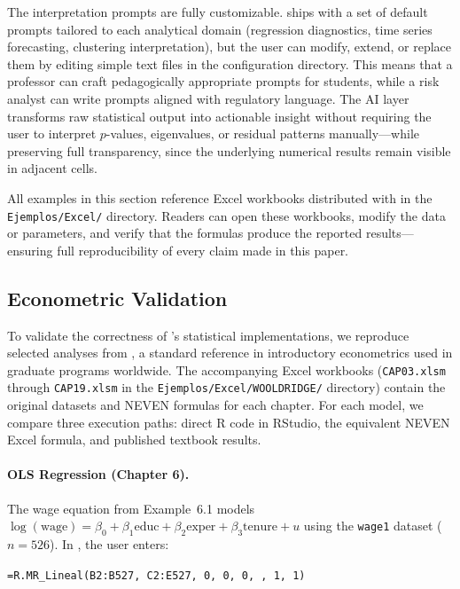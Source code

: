 The interpretation prompts are fully customizable. \neven{} ships with a set of default prompts tailored to each analytical domain (regression diagnostics, time series forecasting, clustering interpretation), but the user can modify, extend, or replace them by editing simple text files in the configuration directory. This means that a professor can craft pedagogically appropriate prompts for students, while a risk analyst can write prompts aligned with regulatory language. The AI layer transforms raw statistical output into actionable insight without requiring the user to interpret $p$-values, eigenvalues, or residual patterns manually---while preserving full transparency, since the underlying numerical results remain visible in adjacent cells.

All examples in this section reference Excel workbooks distributed with \neven{} in the \texttt{Ejemplos/Excel/} directory. Readers can open these workbooks, modify the data or parameters, and verify that the formulas produce the reported results---ensuring full reproducibility of every claim made in this paper.

\subsection{Econometric Validation}
\label{subsec:econometric}

To validate the correctness of \neven{}'s statistical implementations, we reproduce selected analyses from \citet{Wooldridge2016}, a standard reference in introductory econometrics used in graduate programs worldwide. The accompanying Excel workbooks (\texttt{CAP03.xlsm} through \texttt{CAP19.xlsm} in the \texttt{Ejemplos/Excel/WOOLDRIDGE/} directory) contain the original datasets and NEVEN formulas for each chapter. For each model, we compare three execution paths: direct R code in RStudio, the equivalent NEVEN Excel formula, and published textbook results.

\paragraph{OLS Regression (Chapter 6).}
The wage equation from Example~6.1 models $\log(\text{wage}) = \beta_0 + \beta_1 \text{educ} + \beta_2 \text{exper} + \beta_3 \text{tenure} + u$ using the \texttt{wage1} dataset ($n = 526$). In \neven{}, the user enters:

\begin{center}
\texttt{=R.MR\_Lineal(B2:B527, C2:E527, 0, 0, 0, , 1, 1)}
\end{center}

